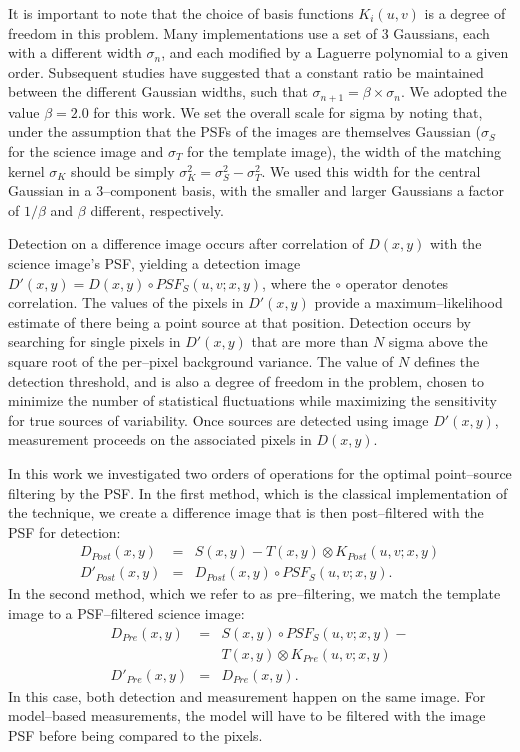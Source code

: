 \documentclass[floatfix, apj]{emulateapj}
\begin{document}
It is important to note that the choice of basis functions $K_i(u,v)$ is a degree of freedom in this problem.
Many implementations \citep{Alard98,Alard00} use a set of 3 Gaussians, each with a different width $\sigma_n$, and each modified by a Laguerre polynomial to a given order.
Subsequent studies \citep[e.g.][]{2007AN....328...16I} have suggested that a constant ratio be maintained between the different Gaussian widths, such that $\sigma_{n+1} = \beta \times \sigma_{n}$.
We adopted the value $\beta = 2.0$ for this work.
We set the overall scale for sigma by noting that, under the assumption that the PSFs of the images are themselves Gaussian ($\sigma_S$ for the science image and $\sigma_T$ for the template image), the width of the matching kernel $\sigma_K$ should be simply $\sigma_K^2 = \sigma_S^2 - \sigma_T^2$.
We used this width for the central Gaussian in a 3--component basis, with the smaller and larger Gaussians a factor of $1/\beta$ and $\beta$ different, respectively.

Detection on a difference image occurs after correlation of $D(x,y)$ with the science image's PSF, yielding a detection image $D'(x,y) = D(x,y) \circ PSF_S(u,v;x,y)$, where the $\circ$ operator denotes correlation.
The values of the pixels in $D'(x,y)$ provide a maximum--likelihood estimate of there being a point source at that position.
Detection occurs by searching for single pixels in $D'(x,y)$ that are more than $N$ sigma above the square root of the per--pixel background variance.
The value of $N$ defines the detection threshold, and is also a degree of freedom in the problem, chosen to minimize the number of statistical fluctuations while maximizing the sensitivity for true sources of variability.
Once sources are detected using image $D'(x,y)$, measurement proceeds on the associated pixels in $D(x,y)$.

In this work we investigated two orders of operations for the optimal point--source filtering by the PSF.
In the first method, which is the classical implementation of the technique, we create a difference image that is then post--filtered with the PSF for detection:
\begin{eqnarray}
D_{Post}(x,y) & = & S(x,y) - T(x,y) \otimes K_{Post}(u,v;x,y)  \nonumber \\
D'_{Post}(x,y) & = & D_{Post}(x,y) \circ PSF_S(u,v;x,y).  \nonumber
\end{eqnarray}
In the second method, which we refer to as pre--filtering, we match the template image to a PSF--filtered science image:
\begin{eqnarray}
D_{Pre}(x,y)  & = & S(x,y) \circ PSF_S(u,v;x,y) - \nonumber \\
             &   & T(x,y) \otimes K_{Pre}(u,v;x,y) \nonumber \\
D'_{Pre}(x,y) & = & D_{Pre}(x,y). \nonumber
\end{eqnarray}
In this case, both detection and measurement happen on the same image.
For model--based measurements, the model will have to be filtered with the image PSF before being compared to the pixels.
\end{document}
